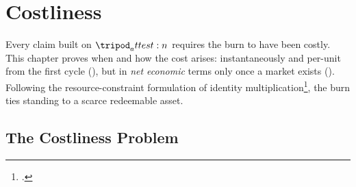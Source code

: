 \documentclass[../main.tex]{subfiles}
\begin{document}
%
%
%

\section{Costliness}
\label{sec:attestation:costliness}

Every claim built on $\attest{}$ requires the burn to have been costly. This chapter proves
when and how the cost arises: instantaneously and per-unit from the first cycle
(), but in \emph{net economic} terms only once a
market exists (). Following the resource-constraint
formulation of identity multiplication\footcite{douceur2002sybil}, the burn ties standing
to a scarce redeemable asset.

\subsection{The Costliness Problem}
\label{sec:costliness:problem}
\end{document}
